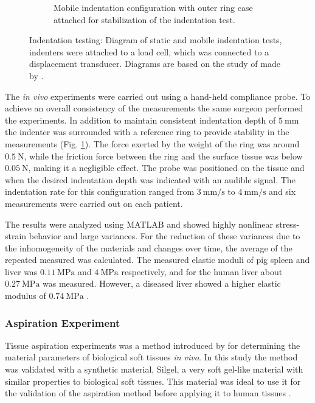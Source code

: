 \begin{figure}
\begin{subfigure}[b]{0.45\textwidth}
        \caption{Mobile indentation configuration with outer ring case attached for stabilization of the indentation test.}
        \label{fig:carter2}
        \end{subfigure}
        \hspace{0.3cm}
        \caption[Indentation setup of synthetic and biological tissues]{Indentation testing: Diagram of static and mobile indentation tests, indenters were attached to a load cell, which was connected to a displacement transducer. Diagrams are based on the study of made by \citet{Carter2001}.}
        \label{fig:indentationcarter}
\end{figure}

The \textit{in vivo} experiments were carried out using a hand-held compliance probe. To achieve 
an overall consistency of the measurements the same surgeon performed the experiments. 
In addition to maintain consistent indentation depth of $\SI{5}{\milli \m}$ the indenter was 
surrounded with a reference ring to provide stability in the measurements (Fig. \ref{fig:carter2}). The force 
exerted by the weight of the ring was around $\SI{0.5}{\newton}$, while the friction force 
between the ring and the surface tissue was below $\SI{0.05}{\newton}$, making it a negligible 
effect. The probe was positioned on the tissue and when the desired indentation depth was 
indicated with an audible signal. The indentation rate for this configuration ranged 
from $\SI[per-mode = symbol]{3}{\milli \m\per \second}$ to $\SI[per-mode = symbol]{4}{\milli \m\per \second}$ and 
six measurements were carried out on each patient.

The results were analyzed using MATLAB and showed highly nonlinear stress-strain behavior and large variances. 
For the reduction of these variances due to the inhomogeneity of the materials and changes over time, 
the average of the repeated measured was calculated. The measured elastic moduli of pig 
spleen and liver was $\SI{0.11}{\mega \pascal}$ and $\SI{4}{\mega \pascal}$ respectively, and 
for the human liver about $\SI{0.27}{\mega \pascal}$ was measured. However, a 
diseased liver showed a higher elastic modulus of $\SI{0.74}{\mega \pascal}$ \cite{Carter2001}.
\subsubsection*{Aspiration Experiment}

Tissue aspiration experiments was a method introduced by \citet{Kauer2002} for determining 
the material parameters of biological soft tissues \textit{in vivo}.
In this study the method was validated with a synthetic material, Silgel, a very 
soft gel-like material with similar properties to biological soft tissues. 
This material was ideal to use it for the validation of the 
aspiration method before applying it to human tissues \cite{Kauer2002}.

